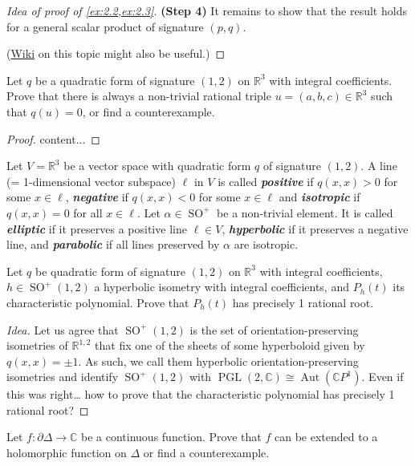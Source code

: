 \documentclass{article}
\numberwithin{equation}{section}
\newcommand{\R}{\mathbb{R}}
\newcommand{\C}{\mathbb{C}}
\DeclareMathOperator{\SO}{SO}
\DeclareMathOperator{\Aut}{Aut}
\DeclareMathOperator{\PGL}{PGL}
\begin{document}
\begin{proof}[Idea of proof of \cref{ex:2.2,ex:2.3}]
		\textbf{(Step 4)} It remains to show that the result holds for a general scalar product of signature $(p,q)$.
		
		(\href{https://en.wikipedia.org/wiki/Indefinite_orthogonal_group#Topology}{Wiki} on this topic might also be useful.)
	\end{proof}
	
	\begin{exercise}
		Let $q$ be a quadratic form of signature $(1,2)$ on $\R^3$ with integral coefficients. Prove that there is always a non-trivial rational triple $u=(a,b,c)\in\R^3$ such that $q(u)=0$, or find a counterexample.
	\end{exercise}
	\begin{proof}
		content...
	\end{proof}
	\begin{defn}
		Let $V=\R^3$ be a vector space with quadratic form $q$ of signature $(1,2)$. A line (= 1-dimensional vector subspace) $\ell$ in $V$ is called \textbf{\textit{positive}} if $q(x,x)>0$ for some $x\in\ell$, \textbf{\textit{negative}} if $q(x,x)<0$ for some $x\in\ell$ and \textbf{\textit{isotropic}} if $q(x,x)=0$ for all $x\in\ell$. Let $\alpha\in\SO^+$ be a non-trivial element. It is called \textbf{\textit{elliptic}} if it preserves a positive line $\ell\in V$, \textbf{\textit{hyperbolic}} if it preserves a negative line, and \textbf{\textit{parabolic}} if all lines preserved by $\alpha$ are isotropic.
	\end{defn}
	
	\begin{exercise}
		Let $q$ be quadratic form of signature $(1,2)$ on $\R^3$ with integral coefficients, $h\in\SO^+(1,2)$ a hyperbolic isometry with integral coefficients, and $P_h(t)$ its characteristic polynomial. Prove that $P_h(t)$ has precisely 1 rational root.
	\end{exercise}
	\begin{proof}[Idea]
		Let us agree that $\SO^+(1,2)$ is the set of orientation-preserving isometries of $\R^{1,2}$ that fix one of the sheets of some hyperboloid given by $q(x,x)=\pm1$. As such, we call them hyperbolic orientation-preserving isometries and identify $\SO^+(1,2)$ with $\PGL(2,\C)\cong\Aut(\C P^1)$. {\color{magenta} Even if this was right… how to prove that the characteristic polynomial has precisely 1 rational root?}
	\end{proof}
	\begin{exercise}
		Let $f:\partial\Delta\to\C$ be a continuous function. Prove that $f$ can be extended to a holomorphic function on $\Delta$ or find a counterexample.
	\end{exercise}
	
	
\end{document}
